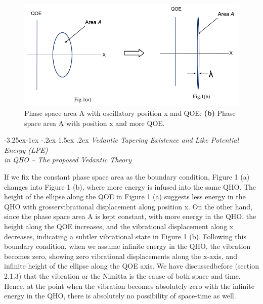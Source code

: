 \documentclass[twoside, 13pt]{article}
\makeatletter
\renewcommand\subsection{\@startsection{subsection}{2}{\z@}%
                                     {-3.25ex\@plus -1ex \@minus -.2ex}%
                                     {1.5ex \@plus .2ex}%
                                     {\normalfont\Large\bfseries}}
\makeatother
\begin{document}
{\begin{figure}[h]
\centering
\includegraphics[scale=.5]{images/001.jpg}
\caption{{\fontsize{10}{12}\selectfont {\bf (a):} Phase space area A with oscillatory position x and QOE; {\bf (b)} Phase space area A with position x and more QOE.}}\label{art1-fig1}
\vspace{-.3cm}

\end{figure}

{\fontsize{8}{10}\selectfont\subsection{\textit{Vedantic Tapering Existence and Like Potential Energy (LPE)\\ in QHO – The proposed Vedantic Theory}}}\label{subsec-3.2}

{\fontsize{12}{14}\selectfont If we fix the constant phase space area as the boundary condition, Figure 1 (a) changes into Figure 1 (b), where more energy is infused into the same QHO. The height of the ellipse along the QOE in Figure 1 (a) suggests less energy in the QHO with grosser\break vibrational displacement along position x. On the other hand, since the phase space area A is kept constant, with more energy in the QHO, the height along the QOE increases, and the vibrational displacement along x decreases, indicating a subtler vibrational state in Figure  1 (b). Following this boundary condition, when we assume infinite energy in the QHO, the vibration becomes zero, showing zero vibrational displacements along the x-axis, and infinite height of the ellipse along the QOE axis. We have discussed\break before (section 2.1.3) that the vibration or the Nimitta is the cause of both space and time. Hence, at the point when the vibration becomes absolutely zero with the infinite energy in the QHO, there is absolutely no possibility of space-time as well.

}}
\end{document}
